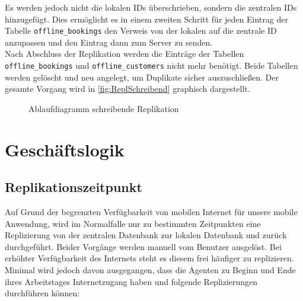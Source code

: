 \documentclass[12pt,a4paper,ngerman,english]{report}
\begin{document}
Es werden jedoch nicht die lokalen IDs überschrieben, sondern die zentralen IDs hinzugefügt. Dies ermöglicht es in einem zweiten Schritt für jeden Eintrag der Tabelle \texttt{offline\_bookings} den Verweis von der lokalen auf die zentrale ID anzupassen und den Eintrag dann zum Server zu senden.\\

Nach Abschluss der Replikation werden die Einträge der Tabellen \texttt{offline\_bookings} und \texttt{offline\_customers} nicht mehr benötigt. Beide Tabellen werden gelöscht und neu angelegt, um Duplikate sicher auszuschließen. Der gesamte Vorgang wird in \autoref{fig:ReplSchreibend} graphisch dargestellt.

\begin{figure}[h]
  \centering
  
  \caption{Ablaufdiagramm schreibende Replikation}
  \label{fig:ReplSchreibend}
\end{figure}

\chapter{Geschäftslogik}

\section{Replikationszeitpunkt}
\label{sec:RepliZeit}

Auf Grund der begrenzten Verfügbarkeit von mobilen Internet für unsere mobile Anwendung, wird im Normalfalle nur zu bestimmten Zeitpunkten eine Replizierung von der zentralen Datenbank zur lokalen Datenbank und zurück durchgeführt. Beider Vorgänge werden manuell vom Benutzer ausgelöst. Bei erhöhter Verfügbarkeit des Internets steht es diesem frei häufiger zu replizieren. Minimal wird jedoch davon ausgegangen, dass die Agenten zu Beginn und Ende ihres Arbeitstages Internetzugang haben und folgende Replizierungen durchführen können:
\end{document}
